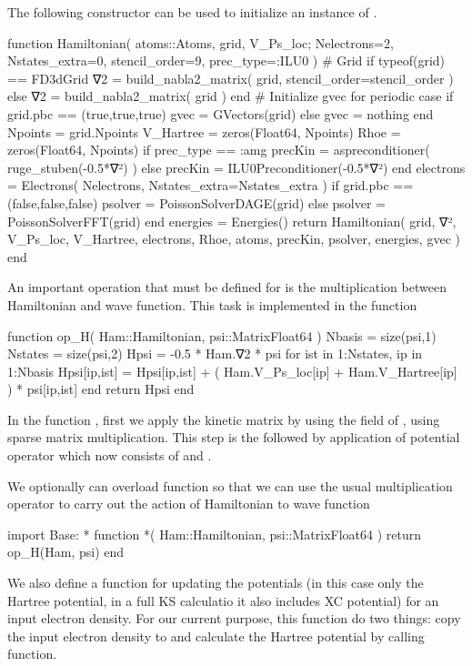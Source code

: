 The following constructor can be used to initialize an instance of .
\begin{juliacode}
function Hamiltonian( atoms::Atoms, grid, V_Ps_loc;
  Nelectrons=2, Nstates_extra=0, stencil_order=9,
  prec_type=:ILU0
)
  # Grid
  if typeof(grid) == FD3dGrid
      ∇2 = build_nabla2_matrix( grid, stencil_order=stencil_order )
  else
      ∇2 = build_nabla2_matrix( grid )
  end
  # Initialize gvec for periodic case
  if grid.pbc == (true,true,true)
      gvec = GVectors(grid)
  else
      gvec = nothing
  end
  Npoints = grid.Npoints
  V_Hartree = zeros(Float64, Npoints)
  Rhoe = zeros(Float64, Npoints)
  if prec_type == :amg
      precKin = aspreconditioner( ruge_stuben(-0.5*∇²) )
  else
      precKin = ILU0Preconditioner(-0.5*∇²)
  end
  electrons = Electrons( Nelectrons, Nstates_extra=Nstates_extra )
  if grid.pbc == (false,false,false)
      psolver = PoissonSolverDAGE(grid)
  else
      psolver = PoissonSolverFFT(grid)
  end
  energies = Energies()
  return Hamiltonian( grid, ∇², V_Ps_loc, V_Hartree, electrons,
                      Rhoe, atoms, precKin, psolver, energies, gvec )
end
\end{juliacode}

An important operation that must be defined for  is the
multiplication between Hamiltonian and wave function.
This task is implemented in the function 
\begin{juliacode}
function op_H( Ham::Hamiltonian, psi::Matrix{Float64} )
  Nbasis = size(psi,1)
  Nstates = size(psi,2)
  Hpsi = -0.5 * Ham.∇2 * psi
  for ist in 1:Nstates, ip in 1:Nbasis
      Hpsi[ip,ist] = Hpsi[ip,ist] + 
        ( Ham.V_Ps_loc[ip] + Ham.V_Hartree[ip] ) * psi[ip,ist]
  end
  return Hpsi
end
\end{juliacode}
In the function , first we apply the kinetic matrix by using the
 field of , using sparse matrix
multiplication. This step is the followed by application of potential operator
which now consists of  and .

We optionally can overload \jlinline{*} function so that we can use the usual
multiplication operator to carry out the action of Hamiltonian to wave function
\begin{juliacode}
import Base: *
function *( Ham::Hamiltonian, psi::Matrix{Float64} )
    return op_H(Ham, psi)
end
\end{juliacode}

We also define a function for updating the potentials (in this case only the Hartree potential, in
a full KS calculatio it also includes XC potential)
for an input electron density.
For our current purpose, this function do two things:
copy the input electron density to  and calculate the
Hartree potential by calling  function.

